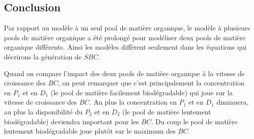 \FloatBarrier
\subsection{Conclusion}
\par{
Par rapport au mod\`ele \`a un seul pool de matière organique,
le mod\`ele \`a plusieurs pools de matière organique a \'et\'e prolongé pour mod\'eliser deux pools de
matière organique différents. Ainsi les modèles diffèrent seulement dans les équations qui
décrirons la génération de $SBC$.
}
\par{
Quand on compare l'impact des deux pools de matière organique à la vitesse de croissance des $BC$, on
peut remarquer que c'est principalement la concentration en $P_1$ et en $D_1$ (le pool de matière facilement
biodégradable) qui joue sur la vitesse de croissance des $BC$. Au plus la concentration en $P_1$ et en $D_1$
diminuera, au plus la disponibilit\'e du $P_2$ et en $D_2$ (le pool de matière lentement biodégradable) deviendra
important pour les $BC$. Du coup le pool de matière lentement biodégradable joue plutôt sur le maximum des
$BC$.
}
